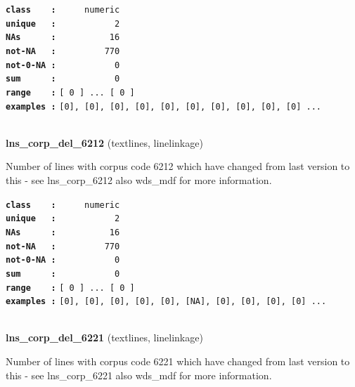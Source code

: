 \documentclass[]{article}
\begin{document}
\textbf{\texttt{class\ \ \ \ :}} \texttt{~~~~~numeric}\\
\textbf{\texttt{unique\ \ \ :}} \texttt{~~~~~~~~~~~2}\\
\textbf{\texttt{NAs\ \ \ \ \ \ :}} \texttt{~~~~~~~~~~16}\\
\textbf{\texttt{not-NA\ \ \ :}} \texttt{~~~~~~~~~770}\\
\textbf{\texttt{not-0-NA\ :}} \texttt{~~~~~~~~~~~0}\\
\textbf{\texttt{sum\ \ \ \ \ \ :}} \texttt{~~~~~~~~~~~0}\\
\textbf{\texttt{range\ \ \ \ :}}
\texttt{{[}\ 0\ {]}\ ...\ {[}\ 0\ {]}}\\
\textbf{\texttt{examples\ :}}
\texttt{{[}0{]},\ {[}0{]},\ {[}0{]},\ {[}0{]},\ {[}0{]},\ {[}0{]},\ {[}0{]},\ {[}0{]},\ {[}0{]},\ {[}0{]}\ ...}\\

~

\textbf{lns\_corp\_del\_6212} (textlines, linelinkage)

Number of lines with corpus code 6212 which have changed from last
version to this - see lns\_corp\_6212 also wds\_mdf for more
information.

\textbf{\texttt{class\ \ \ \ :}} \texttt{~~~~~numeric}\\
\textbf{\texttt{unique\ \ \ :}} \texttt{~~~~~~~~~~~2}\\
\textbf{\texttt{NAs\ \ \ \ \ \ :}} \texttt{~~~~~~~~~~16}\\
\textbf{\texttt{not-NA\ \ \ :}} \texttt{~~~~~~~~~770}\\
\textbf{\texttt{not-0-NA\ :}} \texttt{~~~~~~~~~~~0}\\
\textbf{\texttt{sum\ \ \ \ \ \ :}} \texttt{~~~~~~~~~~~0}\\
\textbf{\texttt{range\ \ \ \ :}}
\texttt{{[}\ 0\ {]}\ ...\ {[}\ 0\ {]}}\\
\textbf{\texttt{examples\ :}}
\texttt{{[}0{]},\ {[}0{]},\ {[}0{]},\ {[}0{]},\ {[}0{]},\ {[}NA{]},\ {[}0{]},\ {[}0{]},\ {[}0{]},\ {[}0{]}\ ...}\\

~

\textbf{lns\_corp\_del\_6221} (textlines, linelinkage)

Number of lines with corpus code 6221 which have changed from last
version to this - see lns\_corp\_6221 also wds\_mdf for more
information.
\end{document}
